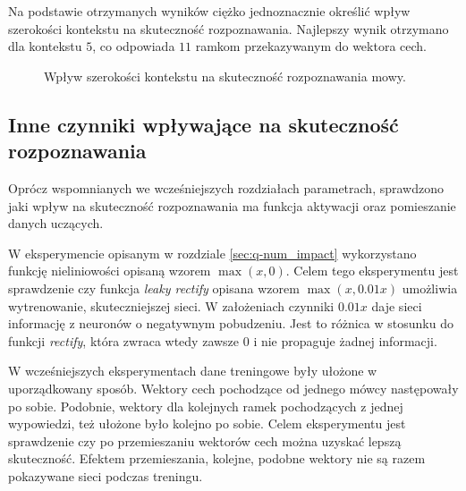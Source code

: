 \documentclass[11pt]{article}
\begin{document}
		Na podstawie otrzymanych wyników ciężko jednoznacznie określić wpływ szerokości kontekstu na skuteczność rozpoznawania. Najlepszy wynik otrzymano dla kontekstu $5$, co odpowiada $11$ ramkom przekazywanym do wektora cech.
		
		\begin{figure}[H]
			\centering
			\label{fig:fig_ctx_impact}
			\caption{Wpływ szerokości kontekstu na skuteczność rozpoznawania mowy.}
		\end{figure}

	\subsection{ Inne czynniki wpływające na skuteczność rozpoznawania }
		Oprócz wspomnianych we wcześniejszych rozdziałach parametrach, sprawdzono jaki wpływ na skuteczność rozpoznawania ma funkcja aktywacji oraz pomieszanie danych uczących. 
		
		W eksperymencie opisanym w rozdziale \ref{sec:q-num_impact} wykorzystano funkcję nieliniowości opisaną wzorem $\max(x,0)$. Celem tego eksperymentu jest sprawdzenie czy funkcja \textit{leaky rectify} opisana wzorem $\max(x, 0.01x)$ umożliwia wytrenowanie, skuteczniejszej sieci. W założeniach czynniki $0.01x$ daje sieci informację z neuronów o negatywnym pobudzeniu. Jest to różnica w stosunku do funkcji \textit{rectify}, która zwraca wtedy zawsze $0$ i nie propaguje żadnej informacji. 
		
		W wcześniejszych eksperymentach dane treningowe były ułożone w uporządkowany sposób. Wektory cech pochodzące od jednego mówcy następowały po sobie. Podobnie, wektory dla kolejnych ramek pochodzących z jednej wypowiedzi, też  ułożone było kolejno po sobie. Celem eksperymentu jest sprawdzenie czy po przemieszaniu wektorów cech można uzyskać lepszą skuteczność. Efektem przemieszania, kolejne, podobne wektory nie są razem pokazywane sieci podczas treningu.
		
\end{document}
